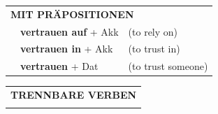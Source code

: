 \documentclass[10pt,a4paper]{revtex4-2}
\begin{document}
\begin{verbbox}
\vspace{10pt}

\begin{tabular}{lll}
\multicolumn{3}{l}{\textbf{MIT PRÄPOSITIONEN}}\\
& \textbf{vertrauen auf} + Akk & (to rely on)\\
& \textbf{vertrauen in} + Akk & (to trust in)\\
& \textbf{vertrauen} + Dat & (to trust someone)\\
\end{tabular}
\hfill
\begin{tabular}{lll}
\multicolumn{3}{l}{\textbf{TRENNBARE VERBEN}}\\
\vspace{30pt}\\
\end{tabular}
\vspace{-5pt}
\end{verbbox}
\end{document}
